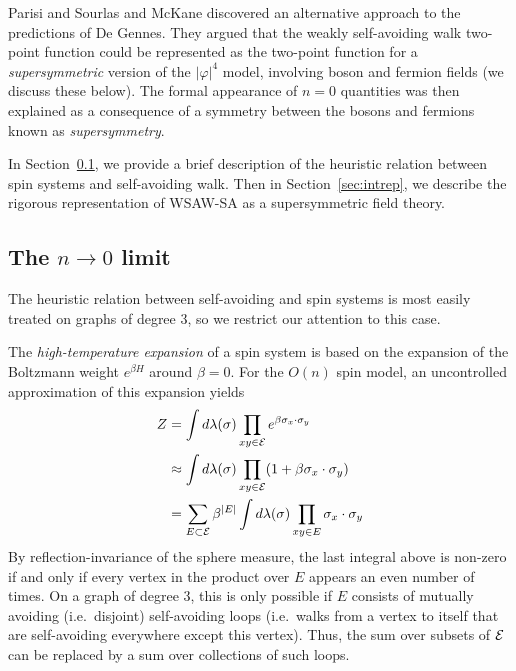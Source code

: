 Parisi and Sourlas \cite{PS80} and McKane \cite{McKa80} discovered
an alternative approach to the predictions of De Gennes. They argued that the weakly
self-avoiding walk two-point function could be represented as the two-point function
for a \emph{supersymmetric} version of the $|\varphi|^4$ model, involving boson and
fermion fields (we discuss these below). The formal appearance of $n = 0$ quantities
was then explained as a consequence of a symmetry between the bosons and fermions known
as \emph{supersymmetry}.

In Section~\ref{sec:ntozero}, we provide a brief description of the heuristic
relation between spin systems and self-avoiding walk. Then in Section~\ref{sec:intrep},
we describe the rigorous representation of WSAW-SA as a supersymmetric field
theory.


\subsection{The \texorpdfstring{$n\to0$}{n approaches 0} limit}
\label{sec:ntozero}


The heuristic relation between self-avoiding and spin systems is most easily treated
on graphs of degree $3$, so we restrict our attention to this case.

The \emph{high-temperature expansion} of a spin system is based on the expansion of the
Boltzmann weight $e^{\beta H}$ around $\beta = 0$.
For the $O(n)$ spin model, an uncontrolled approximation of this expansion yields
\begin{align}
Z 
	&=
\int d\lambda(\sigma) \prod_{xy\in\mathcal{E}} e^{\beta \sigma_x \cdot \sigma_y} \nonumber \\
	&\approx
\int d\lambda(\sigma) \prod_{xy\in\mathcal{E}} (1 + \beta \sigma_x \cdot \sigma_y) \nonumber \\
	&=
\sum_{E \subset \mathcal{E}} \beta^{|E|} \int d\lambda(\sigma) \prod_{xy \in E} \sigma_x \cdot \sigma_y
\end{align}
By reflection-invariance of the sphere measure, the last integral above is non-zero
if and only if every vertex in the product over $E$ appears an even number of times.
On a graph of degree $3$, this is only possible if $E$ consists of mutually avoiding
(i.e.\ disjoint) self-avoiding
loops (i.e.\ walks from a vertex to itself that are self-avoiding everywhere except this
vertex). Thus, the sum over subsets of $\mathcal{E}$ can be replaced by a sum over collections of
such loops.

